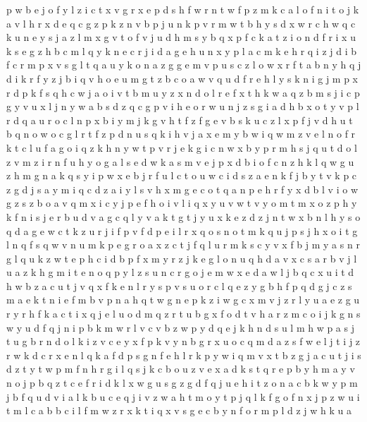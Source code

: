 \documentclass{article}
\begin{document}
p w b e j o f y l z i c t x v g r
x e p d s h f w r n t
w f p z m k c a l o
f n i t o j k a v l h r x d e q c g z p
k z n v b p
j u n k p v r m w t b h y s d x
w r c h
w q c k u n e y s j a z l m x g v t o f
v j u d h m s y b q x p f c k a t z i o
n d f r i x u k s e g z h b
c m l
q y k n e c r j i d
a g e h u
n x y p l a c m k e h r q i
z j d i b f c r m p x v s g l t q a u y k o n
a z
g
g e m v p u s c z l o w x r f t a b n y h q j d i k
r f y z j b i q v h o e u m g
t z b c o a w v q u d f r e h l y s k n i g j m p x
r d p k f s q h c w j a o i v t b m u y z x
n d o l r e f x t h k w a q z b m s j i c p g y v
u x l j n y w a b s d z q c g p v i h e o r
w u n j z s g i a d h b x o t y v p l r
d q a u r o c l n p x b i y m j k g v h t f z
f g e v
b s k u c
z l x p f j v d h u t b q n o
w o c g l r t f z p d n u s q k i h v j a x e m y b
w
i q w m z v e l n o f r k t
c l u f a g o i q z k h n y w t p v r j
e k g i c n w x b y p r m h s j q u t d o l z v
m
z i r n f u h y o g a l s e d w k
a s m v e j p x d b i o f c n z h k l q w g u
z h m g n a k q s y i p w x e b j r f u l c t o
u w c i d s z a e n k f j b y t
v
k p c z g d j s a y m i
q c d z a i y l s
v h x m g e c o
t q a n p e h r f y x d b l v i o w g z s
z b o a v q m x i c y j p e f h
o i v
l i q x y u v w
t v y o m
t m x o z p h y k f n i s j e r b u d v a g c q
l y v a k t
g t j y u x k e z
d z
j n t w
x b n l h y s o q d a g e w c t k z u r j i f p v
f d p e i l r x q o s n
o t m k q u j p
s j h x o i t g l n q f
s q w v n u m k p e g r o a x z c t j f
q l u r m k s c y
v x f b j m y a s n r g l q u k z w t e p h c i d
b p f x m y r z j k e g l o n u q h d a v
x c s a r b v
j l u a z k h g m i t e n o q p
y l z s u n c r g o j e m w x
e d a w l j b q c x u i t
d h w b z a c u t j v q x f k e n l r y s p
v s u o r c l q e z y g b h f
p q d g j c z s m a e k t n
i e f m b v p n a h q t w g
n e p
k z i w g c x m
v j z r l y u a
e z g u r
y r h f k a c t i x q j e l u o d
m q z r t u b g x f o d
t v h a r z m c o i j k g n s w y u d f q
j n i
p b k m w r l v c
v b z w p y d q e j
k h n d s u
l
m h w p a s j t u g b r n d o l k i z v c e y x f
p k v y n b g r x u o c q m d a z s f w e l j t i
j z r w k d
c r x e n l q k a f d p s g
n f e h l r k p y w i q m v x t b z g j a c u
t j i s
d z t
y t w p m f n h r g i l q s j k c b o u z v e x a d
k s t q r e p b y
h m a y v n o j p b q z t c e f r i d k l x w g u s
g z
g d f q j u e h i t z o n a c b k w y p m
j b f q u d v i a
l k b u c e q j i v z w a h t m o y
t p
j q l k f g o
f n x j p z w u i t m l c a b
b c i l f m w z r x k
t i q x v s g e c b y n f o r m p l d z j w h k u a
\end{document}
